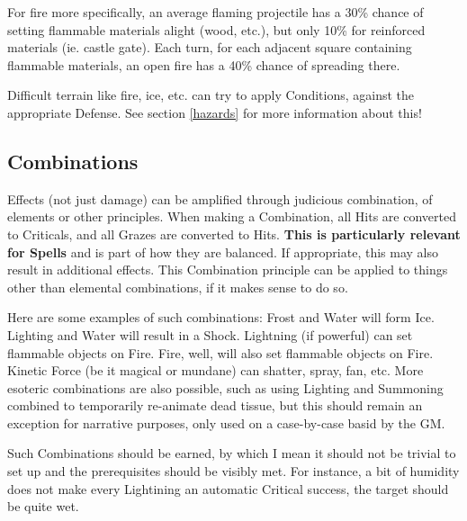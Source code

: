 For fire more specifically, an average flaming projectile has a 30\% chance of setting flammable materials alight (wood, etc.), but only 10\% for reinforced materials (ie. castle gate). Each turn, for each adjacent square containing flammable materials, an open fire has a 40\% chance of spreading there.

Difficult terrain like fire, ice, etc. can try to apply Conditions, against the appropriate Defense. See section \ref{hazards} for more information about this!


\subsection{Combinations}

\label{combinations}

Effects (not just damage) can be amplified through judicious combination, of elements or other principles. When making a Combination, all Hits are converted to Criticals, and all Grazes are converted to Hits. \textbf{This is particularly relevant for Spells} and is part of how they are balanced. If appropriate, this may also result in additional effects. This Combination principle can be applied to things other than elemental combinations, if it makes sense to do so.

Here are some examples of such combinations: Frost and Water will form Ice. Lighting and Water will result in a Shock. Lightning (if powerful) can set flammable objects on Fire. Fire, well, will also set flammable objects on Fire. Kinetic Force (be it magical or mundane) can shatter, spray, fan, etc. More esoteric combinations are also possible, such as using Lighting and Summoning combined to temporarily re-animate dead tissue, but this should remain an exception for narrative purposes, only used on a case-by-case basid by the GM.

Such Combinations should be earned, by which I mean it should not be trivial to set up and the prerequisites should be visibly met. For instance, a bit of humidity does not make every Lightining an automatic Critical success, the target should be quite wet.

